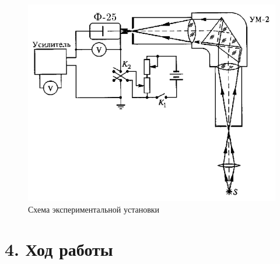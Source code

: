 \documentclass[a4paper,12pt]{report}
\begin{document}
\begin{figure}[H]
\centering
\includegraphics[width=0.6\linewidth]{ustanovka.png}
\caption{Схема экспериментальной установки}
\end{figure}
	
\section*{4. Ход работы}
\end{document}

